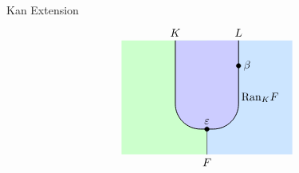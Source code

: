 \begin{definition}{Kan Extension}{}
\[\begin{tikzpicture}
    \begin{scope}[shift={(7.5,0)}]
        \begin{scope} 
            \clip (-2.7,0) rectangle (2.7, 3.6);     
            \fill[fill=leftcolor] (-3,0) rectangle (0, 4);  
            \fill[fill=rightcolor] (0,0) rectangle (3, 4);  
            \draw[fill=midcolor, rounded corners=0.8cm, line width=0.7pt] (-1, 5.6) rectangle (1, 0.8);
        \end{scope}
        \draw (0, 0) -- (0,0.8);
        \filldraw [black] (1,2.8) circle (2pt) node[right=1pt] {$\beta$};
   
        \node[above] at (-1, 3.6) {$K$};
        \node[right=-1pt] at (1, 1.8) {$\mathrm{Ran}_KF$};

        \node[above] at (1, 3.6) {$L$};
        \filldraw [black] (0, 0.8) circle (2pt) node[above=1pt] {$\varepsilon$};
    
       
        \node[below] at (0, 0) {$F$};
    \end{scope}

    
    \end{tikzpicture}
\]


\end{definition}


